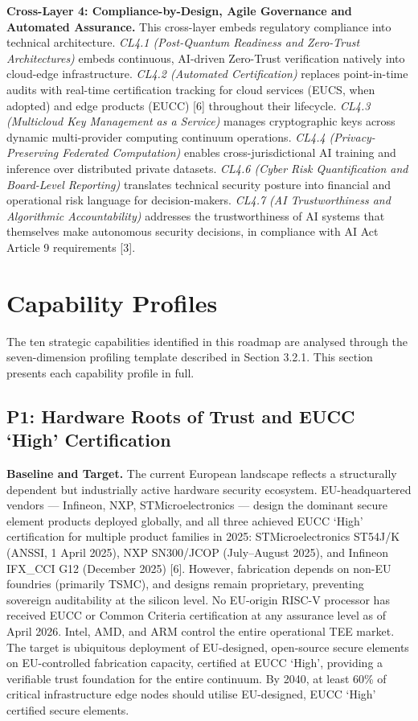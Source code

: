 \documentclass{ieeeaccess}
\begin{document}
\textbf{Cross-Layer 4: Compliance-by-Design, Agile Governance and
Automated Assurance.} This cross-layer embeds regulatory compliance into
technical architecture. \emph{CL4.1 (Post-Quantum Readiness and
Zero-Trust Architectures)} embeds continuous, AI-driven Zero-Trust
verification natively into cloud-edge infrastructure. \emph{CL4.2
(Automated Certification)} replaces point-in-time audits with real-time
certification tracking for cloud services (EUCS, when adopted) and edge
products (EUCC) {[}6{]} throughout their lifecycle. \emph{CL4.3
(Multicloud Key Management as a Service)} manages cryptographic keys
across dynamic multi-provider computing continuum operations.
\emph{CL4.4 (Privacy-Preserving Federated Computation)} enables
cross-jurisdictional AI training and inference over distributed private
datasets. \emph{CL4.6 (Cyber Risk Quantification and Board-Level
Reporting)} translates technical security posture into financial and
operational risk language for decision-makers. \emph{CL4.7 (AI
Trustworthiness and Algorithmic Accountability)} addresses the
trustworthiness of AI systems that themselves make autonomous security
decisions, in compliance with AI Act Article 9 requirements {[}3{]}.

\section{Capability Profiles}\label{capability-profiles}

The ten strategic capabilities identified in this roadmap are analysed
through the seven-dimension profiling template described in Section
3.2.1. This section presents each capability profile in full.

\subsection{P1: Hardware Roots of Trust and EUCC `High'
Certification}\label{p1-hardware-roots-of-trust-and-eucc-high-certification}

\textbf{Baseline and Target.} The current European landscape reflects a
structurally dependent but industrially active hardware security
ecosystem. EU-headquartered vendors --- Infineon, NXP,
STMicroelectronics --- design the dominant secure element products
deployed globally, and all three achieved EUCC `High' certification for
multiple product families in 2025: STMicroelectronics ST54J/K (ANSSI, 1
April 2025), NXP SN300/JCOP (July--August 2025), and Infineon IFX\_CCI
G12 (December 2025) {[}6{]}. However, fabrication depends on non-EU
foundries (primarily TSMC), and designs remain proprietary, preventing
sovereign auditability at the silicon level. No EU-origin RISC-V
processor has received EUCC or Common Criteria certification at any
assurance level as of April 2026. Intel, AMD, and ARM control the entire
operational TEE market. The target is ubiquitous deployment of
EU-designed, open-source secure elements on EU-controlled fabrication
capacity, certified at EUCC `High', providing a verifiable trust
foundation for the entire continuum. By 2040, at least 60\% of critical
infrastructure edge nodes should utilise EU-designed, EUCC `High'
certified secure elements.
\end{document}
